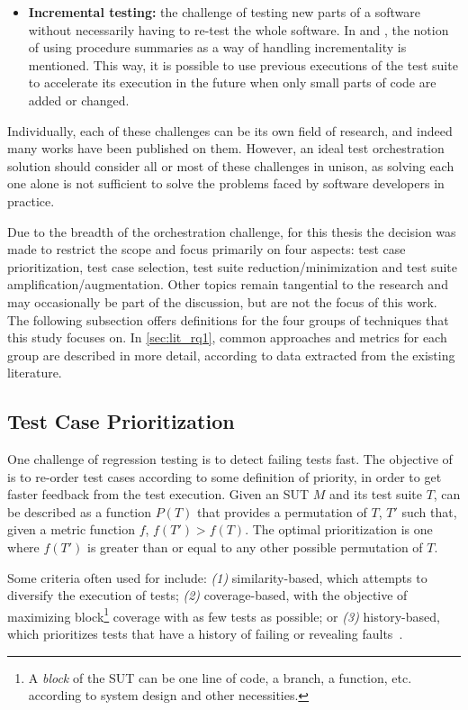 \begin{itemize}
	\item \textbf{Incremental testing:} the challenge of testing new parts of a software without necessarily having to re-test the whole software. In \cite{harman_start-ups_2018} and \cite{ohearn_continuous_2018}, the notion of using procedure summaries as a way of handling incrementality is mentioned. This way, it is possible to use previous executions of the test suite to accelerate its execution in the future when only small parts of code are added or changed.
\end{itemize}

Individually, each of these challenges can be its own field of research, and indeed many works have been published on them.
However, an ideal test orchestration solution should consider all or most of these challenges in unison, as solving each one alone is not sufficient to solve the problems faced by software developers in practice.

Due to the breadth of the orchestration challenge, for this thesis the decision was made to restrict the scope and focus primarily on four aspects: test case prioritization, test case selection, test suite reduction/minimization and test suite amplification/augmentation.
Other topics remain tangential to the research and may occasionally be part of the discussion, but are not the focus of this work.
The following subsection offers definitions for the four groups of techniques that this study focuses on.
In \autoref{sec:lit_rq1}, common approaches and metrics for each group are described in more detail, according to data extracted from the existing literature.

\subsection{Test Case Prioritization}
\label{sec:tcp}

One challenge of regression testing is to detect failing tests fast.
The objective of \tcp is to re-order test cases according to some definition of priority, in order to get faster feedback from the test execution.
Given an SUT $M$ and its test suite $T$,
\tcp can be described as a function $P(T)$ that provides a permutation of $T$, $T'$ such that, given a metric function $f$, $f(T') > f(T)$.
The optimal prioritization is one where $f(T')$ is greater than or equal to any other possible permutation of $T$. 

Some criteria often used for \tcp include: \textit{(1)} similarity-based, which attempts to diversify the execution of tests; \textit{(2)} coverage-based, with the objective of maximizing block\footnote{A \textit{block} of the SUT can be one line of code, a branch, a function, etc. according to system design and other necessities.} coverage with as few tests as possible; or \textit{(3)} history-based, which prioritizes tests that have a history of failing or revealing faults~\cite{khatibsyarbini_test_2018}.

